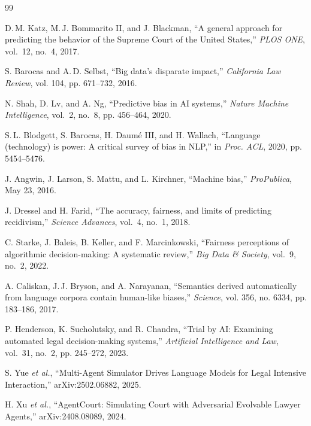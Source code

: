 \documentclass[conference]{IEEEtran}
\begin{document}
\balance

\begin{thebibliography}{99}

D.\,M. Katz, M.\,J. Bommarito II, and J. Blackman,
``A general approach for predicting the behavior of the Supreme Court of the United States,''
\emph{PLOS ONE}, vol.~12, no.~4, 2017.

S. Barocas and A.\,D. Selbst,
``Big data's disparate impact,''
\emph{California Law Review}, vol. 104, pp. 671--732, 2016.

N. Shah, D. Lv, and A. Ng,
``Predictive bias in AI systems,''
\emph{Nature Machine Intelligence}, vol.~2, no.~8, pp. 456--464, 2020.

S.\,L. Blodgett, S. Barocas, H. Daum\'e III, and H. Wallach,
``Language (technology) is power: A critical survey of bias in NLP,''
in \emph{Proc. ACL}, 2020, pp. 5454--5476.

J. Angwin, J. Larson, S. Mattu, and L. Kirchner,
``Machine bias,''
\emph{ProPublica}, May 23, 2016.

J. Dressel and H. Farid,
``The accuracy, fairness, and limits of predicting recidivism,''
\emph{Science Advances}, vol.~4, no.~1, 2018.

C. Starke, J. Baleis, B. Keller, and F. Marcinkowski,
``Fairness perceptions of algorithmic decision-making: A systematic review,''
\emph{Big Data \& Society}, vol.~9, no.~2, 2022.

A. Caliskan, J.\,J. Bryson, and A. Narayanan,
``Semantics derived automatically from language corpora contain human-like biases,''
\emph{Science}, vol. 356, no. 6334, pp. 183--186, 2017.

P. Henderson, K. Sucholutsky, and R. Chandra,
``Trial by AI: Examining automated legal decision-making systems,''
\emph{Artificial Intelligence and Law}, vol.~31, no.~2, pp. 245--272, 2023.

S. Yue \emph{et al.},
``Multi-Agent Simulator Drives Language Models for Legal Intensive Interaction,''
arXiv:2502.06882, 2025.

H. Xu \emph{et al.},
``AgentCourt: Simulating Court with Adversarial Evolvable Lawyer Agents,''
arXiv:2408.08089, 2024.


\end{thebibliography}
\end{document}
